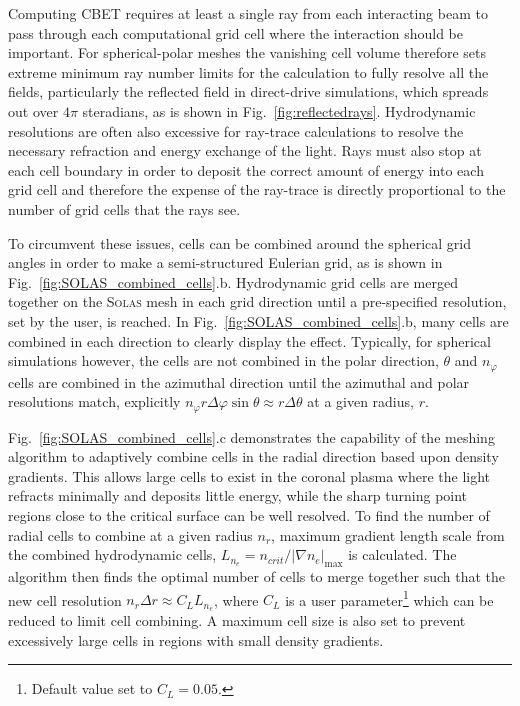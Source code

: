 Computing \ac{CBET} requires at least a single ray from each interacting beam to pass through each computational grid cell where the interaction should be important.
For spherical-polar meshes the vanishing cell volume therefore sets extreme minimum ray number limits for the calculation to fully resolve all the fields, particularly the reflected field in direct-drive simulations, which spreads out over $4\pi$ steradians, as is shown in Fig.~\ref{fig:reflectedrays}.
Hydrodynamic resolutions are often also excessive for ray-trace calculations to resolve the necessary refraction and energy exchange of the light.
Rays must also stop at each cell boundary in order to deposit the correct amount of energy into each grid cell and therefore the expense of the ray-trace is directly proportional to the number of grid cells that the rays see.

To circumvent these issues, cells can be combined around the spherical grid angles in order to make a semi-structured Eulerian grid, as is shown in Fig.~\ref{fig:SOLAS_combined_cells}.b.
Hydrodynamic grid cells are merged together on the \textsc{Solas} mesh in each grid direction until a pre-specified resolution, set by the user, is reached.
In Fig.~\ref{fig:SOLAS_combined_cells}.b, many cells are combined in each direction to clearly display the effect.
Typically, for spherical simulations however, the cells are not combined in the polar direction, $\theta$ and $n_{\varphi}$ cells are combined in the azimuthal direction until the azimuthal and polar resolutions match, explicitly $n_{\varphi}r\Delta\varphi\sin\theta \approx r \Delta\theta$ at a given radius, $r$.

Fig.~\ref{fig:SOLAS_combined_cells}.c demonstrates the capability of the meshing algorithm to adaptively combine cells in the radial direction based upon density gradients.
This allows large cells to exist in the coronal plasma where the light refracts minimally and deposits little energy, while the sharp turning point regions close to the critical surface can be well resolved.
To find the number of radial cells to combine at a given radius $n_r$, maximum gradient length scale from the combined hydrodynamic cells, $L_{n_e}=n_{crit}/|\nabla n_e|_{\max}$ is calculated.
The algorithm then finds the optimal number of cells to merge together such that the new cell resolution $n_r\Delta r \approx C_L L_{n_e}$, where $C_L$ is a user parameter\footnote{Default value set to $C_L=0.05$.} which can be reduced to limit cell combining.
A maximum cell size is also set to prevent excessively large cells in regions with small density gradients.

